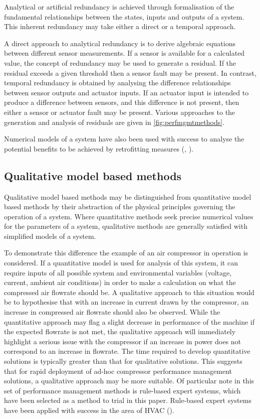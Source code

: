 Analytical or artificial redundancy is achieved through formalisation of the fundamental relationships between the states, inputs and outputs of a system. This inherent redundancy may take either a direct or a temporal approach.

A direct approach to analytical redundancy is to derive algebraic equations between different sensor measurements. If a sensor is available for a calculated value, the concept of redundancy may be used to generate a residual. If the residual exceeds a given threshold then a sensor fault may be present. In contrast, temporal redundancy is obtained by analysing the difference relationships between sensor outputs and actuator inputs. If an actuator input is intended to produce a difference between sensors, and this difference is not present, then either a sensor or actuator fault may be present. Various approaches to the generation and analysis of residuals are given in \autoref{fig:perfmgmtmethods}.

Numerical models of a system have also been used with success to analyse the potential benefits to be achieved by retrofitting measures (\cite{Murray2012}, \cite{Murray2014}).

\subsection{Qualitative model based methods}
\label{subsec:qualimodel}
Qualitative model based methods may be distinguished from quantitative model based methods by their abstraction of the physical principles governing the operation of a system. Where quantitative methods seek precise numerical values for the parameters of a system, qualitative methods are generally satisfied with simplified models of a system.

To demonstrate this difference the example of an air compressor in operation is considered. If a quantitative model is used for analysis of this system, it can require inputs of all possible system and environmental variables (voltage, current, ambient air conditions) in order to make a calculation on what the compressed air flowrate should be. A qualitative approach to this situation would be to hypothesise that with an increase in current drawn by the compressor, an increase in compressed air flowrate should also be observed. While the quantitative approach may flag a slight decrease in performance of the machine if the expected flowrate is not met, the qualitative approach will immediately highlight a serious issue with the compressor if an increase in power does not correspond to an increase in flowrate. The time required to develop quantitative solutions is typically greater than that for qualitative solutions. This suggests that for rapid deployment of ad-hoc compressor performance management solutions, a qualitative approach may be more suitable. Of particular note in this set of performance management methods is rule-based expert systems, which have been selected as a method to trial in this paper. Rule-based expert systems have been applied with success in the area of HVAC (\cite{Bruton2014a}).


